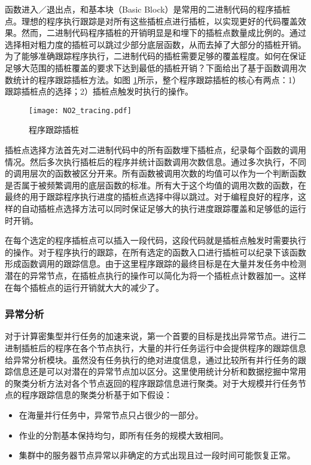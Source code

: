 函数进入／退出点，和基本块（Basic Block）是常用的二进制代码的程序插桩点。理想的程序执行跟踪是对所有这些插桩点进行插桩，以实现更好的代码覆盖效果。然而，二进制代码程序插桩的开销明显是和埋下的插桩点数量成比例的。通过选择相对粗力度的插桩可以跳过少部分底层函数，从而去掉了大部分的插桩开销。为了能够准确跟踪程序执行，二进制代码的插桩需要足够的覆盖程度。如何在保证足够大范围的插桩覆盖的要求下达到最低的插桩开销？下面给出了基于函数调用次数统计的程序跟踪插桩方法。如图 \ref{figure:tracing}所示，整个程序跟踪插桩的核心有两点：1）跟踪插桩点的选择；2）插桩点触发时执行的操作。
\begin{figure}
  \centering
  \texttt{[image: NO2\_tracing.pdf]}
  \caption{程序跟踪插桩}
  \label{figure:tracing}
\end{figure}

插桩点选择方法首先对二进制代码中的所有函数埋下插桩点，纪录每个函数的调用情况。然后多次执行插桩后的程序并统计函数调用次数信息。通过多次执行，不同的调用层次的函数被区分开来。所有函数被调用次数的均值可以作为一个判断函数是否属于被频繁调用的底层函数的标准。所有大于这个均值的调用次数的函数，在最终的用于跟踪程序执行进度的插桩点选择中得以跳过。对于编程良好的程序，这样的自动插桩点选择方法可以同时保证足够大的执行进度跟踪覆盖和足够低的运行时开销。

在每个选定的程序插桩点可以插入一段代码，这段代码就是插桩点触发时需要执行的操作。对于程序执行的跟踪，在所有选定的函数入口进行插桩可以纪录下该函数形成函数调用的跟踪信息。由于这里程序跟踪的最终目标是在大量并发任务中检测潜在的异常节点，在插桩点执行的操作可以简化为将一个插桩点计数器加一。这样在每个插桩点的运行开销就大大的减少了。

\subsubsection{异常分析}
\label{subsec:no2_clustering}
对于计算密集型并行任务的加速来说，第一个首要的目标是找出异常节点。进行二进制插桩后的程序在各个节点执行，大量的并行任务运行中会提供程序的跟踪信息给异常分析模块。虽然没有任务执行的绝对进度信息，通过比较所有并行任务的跟踪信息还是可以对潜在的异常节点加以区分。这里使用统计分析和数据挖掘中常用的聚类分析方法对各个节点返回的程序跟踪信息进行聚类。对于大规模并行任务节点的程序跟踪信息的聚类分析基于如下假设：
\begin{itemize}
\item 在海量并行任务中，异常节点只占很少的一部分。
\item 作业的分割基本保持均匀，即所有任务的规模大致相同。
\item 集群中的服务器节点异常以非确定的方式出现且过一段时间可能恢复正常。
\end{itemize}

